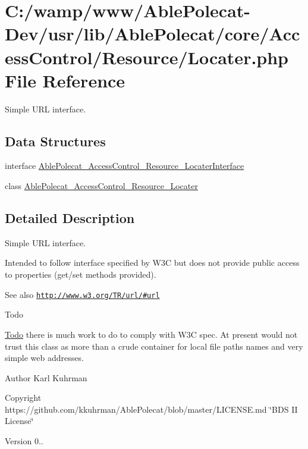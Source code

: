 \hypertarget{_locater_8php}{}\section{C\+:/wamp/www/\+Able\+Polecat-\/\+Dev/usr/lib/\+Able\+Polecat/core/\+Access\+Control/\+Resource/\+Locater.php File Reference}
\label{_locater_8php}


Simple U\+R\+L interface.  


\subsection*{Data Structures}
\begin{DoxyCompactItemize}
\item 
interface \hyperlink{interface_able_polecat___access_control___resource___locater_interface}{Able\+Polecat\+\_\+\+Access\+Control\+\_\+\+Resource\+\_\+\+Locater\+Interface}
\item 
class \hyperlink{class_able_polecat___access_control___resource___locater}{Able\+Polecat\+\_\+\+Access\+Control\+\_\+\+Resource\+\_\+\+Locater}
\end{DoxyCompactItemize}


\subsection{Detailed Description}
Simple U\+R\+L interface. 

Intended to follow interface specified by W3\+C but does not provide public access to properties (get/set methods provided).

\begin{DoxySeeAlso}{See also}
\href{http://www.w3.org/TR/url/#url}{\tt http\+://www.\+w3.\+org/\+T\+R/url/\#url}
\end{DoxySeeAlso}
\begin{DoxyRefDesc}{Todo}
\item[\hyperlink{todo__todo000001}{Todo}]there is much work to do to comply with W3\+C spec. At present would not trust this class as more than a crude container for local file paths names and very simple web addresses.\end{DoxyRefDesc}


\begin{DoxyAuthor}{Author}
Karl Kuhrman 
\end{DoxyAuthor}
\begin{DoxyCopyright}{Copyright}
https\+://github.com/kkuhrman/\+Able\+Polecat/blob/master/\+L\+I\+C\+E\+N\+S\+E.\+md \char`\"{}\+B\+D\+S I\+I License\char`\"{} 
\end{DoxyCopyright}
\begin{DoxyVersion}{Version}
0.. 
\end{DoxyVersion}
